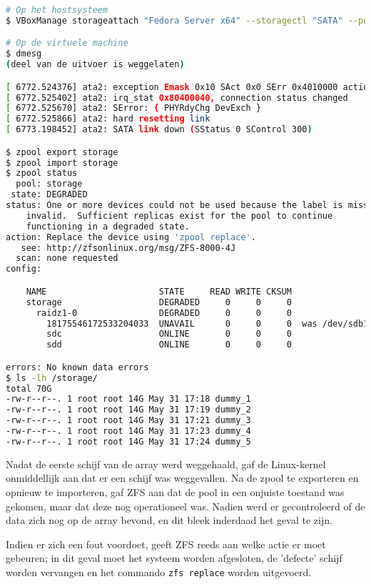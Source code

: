 \begin{lstlisting}[language=bash,style=command_style]
# Op het hostsysteem
$ VBoxManage storageattach "Fedora Server x64" --storagectl "SATA" --port 1 --device 0 --medium none

# Op de virtuele machine
$ dmesg
(deel van de uitvoer is weggelaten)

[ 6772.524376] ata2: exception Emask 0x10 SAct 0x0 SErr 0x4010000 action 0xe frozen
[ 6772.525402] ata2: irq_stat 0x80400040, connection status changed
[ 6772.525670] ata2: SError: { PHYRdyChg DevExch }
[ 6772.525866] ata2: hard resetting link
[ 6773.198452] ata2: SATA link down (SStatus 0 SControl 300)

$ zpool export storage
$ zpool import storage
$ zpool status 
  pool: storage
 state: DEGRADED
status: One or more devices could not be used because the label is missing or
	invalid.  Sufficient replicas exist for the pool to continue
	functioning in a degraded state.
action: Replace the device using 'zpool replace'.
   see: http://zfsonlinux.org/msg/ZFS-8000-4J
  scan: none requested
config:

	NAME                      STATE     READ WRITE CKSUM
	storage                   DEGRADED     0     0     0
	  raidz1-0                DEGRADED     0     0     0
	    18175546172533204033  UNAVAIL      0     0     0  was /dev/sdb1
	    sdc                   ONLINE       0     0     0
	    sdd                   ONLINE       0     0     0

errors: No known data errors
$ ls -lh /storage/
total 70G
-rw-r--r--. 1 root root 14G May 31 17:18 dummy_1
-rw-r--r--. 1 root root 14G May 31 17:19 dummy_2
-rw-r--r--. 1 root root 14G May 31 17:21 dummy_3
-rw-r--r--. 1 root root 14G May 31 17:23 dummy_4
-rw-r--r--. 1 root root 14G May 31 17:24 dummy_5
\end{lstlisting}

Nadat de eerste schijf van de array werd weggehaald, gaf de Linux-kernel onmiddellijk aan dat er een schijf was weggevallen. Na de zpool te exporteren en opnieuw te importeren, gaf ZFS aan dat de pool in een onjuiste toestand was gekomen, maar dat deze nog operationeel was. Nadien werd er gecontroleerd of de data zich nog op de array bevond, en dit bleek inderdaad het geval te zijn.

Indien er zich een fout voordoet, geeft ZFS reeds aan welke actie er moet gebeuren; in dit geval moet het systeem worden afgesloten, de 'defecte' schijf worden vervangen en het commando \texttt{zfs replace} worden uitgevoerd.

